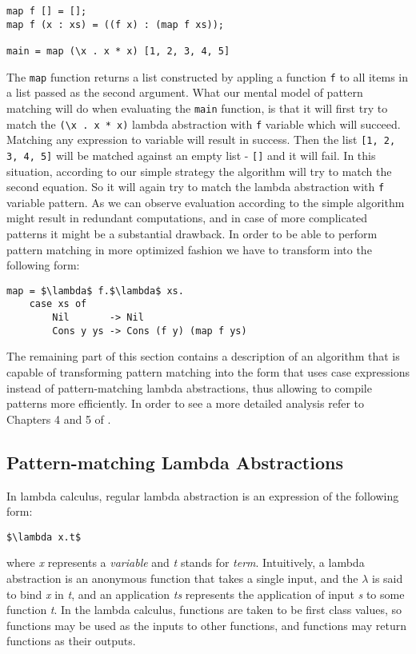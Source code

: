 \documentclass[a4paper]{report}
\begin{document}
\begin{lstlisting}[label=lst:map,caption={Map function example.}]
map f [] = [];
map f (x : xs) = ((f x) : (map f xs));

main = map (\x . x * x) [1, 2, 3, 4, 5]
\end{lstlisting}

The \texttt{map} function returns a list constructed by appling a function
\texttt{f} to all items in a list passed as the second argument. What our
mental model of pattern matching will do when evaluating the \texttt{main}
function, is that it will first try to match the \texttt{(\textbackslash x . x
* x)} lambda abstraction with \texttt{f} variable which will succeed. Matching
any expression to variable will result in success. Then the list \texttt{[1, 2,
3, 4, 5]} will be matched against an empty list - \texttt{[]} and it will fail.
In this situation, according to our simple strategy the algorithm will try to
match the second equation. So it will again try to match the lambda abstraction
with \texttt{f} variable pattern. As we can observe evaluation according to the
simple algorithm might result in redundant computations, and in case of more
complicated patterns it might be a substantial drawback. In order to be able to
perform pattern matching in more optimized fashion we have to transform into
the following form:

\begin{lstlisting}[mathescape=true]
map = $\lambda$ f.$\lambda$ xs.
    case xs of
        Nil       -> Nil
        Cons y ys -> Cons (f y) (map f ys)
\end{lstlisting}

The remaining part of this section contains a description of an algorithm that
is capable of transforming pattern matching into the form that uses case
expressions instead of pattern-matching lambda abstractions, thus allowing to
compile patterns more efficiently. In order to see a more detailed analysis
refer to Chapters 4 and 5 of \cite{jones87}.

\subsection{Pattern-matching Lambda Abstractions}
In lambda calculus, regular lambda abstraction is an expression of the
following form:
\begin{lstlisting}[mathescape=true]
$\lambda x.t$
\end{lstlisting}
where \textit{x} represents a \textit{variable} and \textit{t} stands for
\textit{term}. Intuitively, a lambda abstraction is an anonymous function that
takes a single input, and the \(\lambda\) is said to bind \textit{x} in
\textit{t}, and an application \textit{ts} represents the application of input
\textit{s} to some function \textit{t}. In the lambda calculus, functions are
taken to be first class values, so functions may be used as the inputs to other
functions, and functions may return functions as their outputs.
\end{document}
